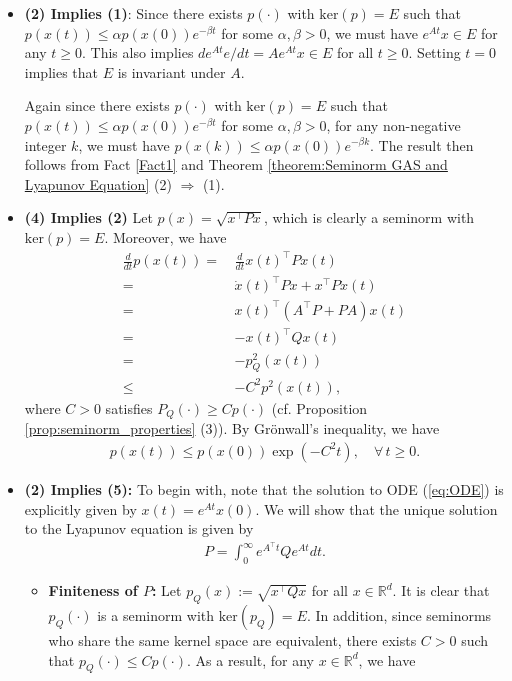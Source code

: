 \documentclass[11 pt]{article}
\begin{document}
\begin{itemize}
		\item \textbf{(2) Implies (1)}: Since there exists $p(\cdot)$ with $\text{ker}(p)=E$ such that $p(x(t))\leq \alpha p(x(0))e^{-\beta t}$ for some $\alpha,\beta>0$, we must have $e^{At}x\in E$ for any $t\geq 0$. This also implies $d e^{At} e/dt=Ae^{At}x\in E$ for all $t\geq 0$. Setting $t=0$ implies that $E$ is invariant under $A$. 
		
		Again since there exists $p(\cdot)$ with $\text{ker}(p)=E$ such that $p(x(t))\leq \alpha p(x(0))e^{-\beta t}$ for some $\alpha,\beta>0$, for any non-negative integer $k$, we must have $p(x(k))\leq \alpha p(x(0))e^{-\beta k}$. The result then follows from Fact \ref{Fact1} and Theorem \ref{theorem:Seminorm GAS and Lyapunov Equation} (2) $\Rightarrow$ (1).
		
		
		\item \textbf{(4) Implies (2)} Let $p(x)=\sqrt{x^\top Px}$, which is clearly a seminorm with $\text{ker}(p)=E$. Moreover, we have
		\begin{align*}
			\frac{d}{dt}p(x(t))=\,&\frac{d}{dt}x(t)^\top Px(t)\\
			=\,&\dot{x}(t)^\top Px+x^\top P\dot{x}(t)\\
			=\,&x(t)^\top (A^\top P+PA)x(t)\\
			=\,&-x(t)^\top Qx(t)\\
			=\,&-p_Q^2(x(t))\\
			\leq \,&-C^2p^2(x(t)),
		\end{align*}
		where $C>0$ satisfies $P_Q(\cdot)\geq Cp(\cdot)$ (cf. Proposition \ref{prop:seminorm_properties} (3)). 
		By Gr\"{o}nwall's inequality, we have 
		\begin{align*}
			p(x(t))\leq p(x(0))\exp\left(-C^2 t\right),\quad \forall\,t\geq 0.
		\end{align*}
		\item \textbf{(2) Implies (5):} To begin with, note that the solution to ODE (\ref{eq:ODE}) is explicitly given by $x(t)=e^{At}x(0)$. We will show that the unique solution to the Lyapunov equation is given by
		\begin{align}\label{eq:solution_CLE}
			P=\int_0^\infty e^{A^\top t}Qe^{At}dt.
		\end{align}
		\begin{itemize}
			\item \textbf{Finiteness of $P$:} Let $p_Q(x):=\sqrt{x^\top Qx}$ for all $x\in\mathbb{R}^d$. It is clear that $p_Q(\cdot)$ is a seminorm with $\text{ker}(p_Q)=E$. In addition, since seminorms who share the same kernel space are equivalent, there exists $C>0$ such that $p_Q(\cdot)\leq Cp(\cdot)$. As a result, for any $x\in\mathbb{R}^d$, we have

\end{itemize}
\end{itemize}
\end{document}
